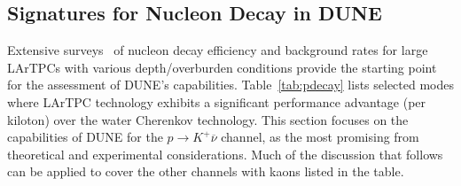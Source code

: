 \subsection{Signatures for Nucleon Decay in DUNE}

Extensive surveys~\cite{Bueno:2007um,Klinger:2015kva} of nucleon decay efficiency 
and background rates for large LArTPCs with various depth/overburden 
conditions provide the starting point for the 
assessment of DUNE's capabilities.  Table~\ref{tab:pdecay} lists selected
modes where LArTPC technology exhibits a significant performance 
advantage (per kiloton) over the water Cherenkov technology.
This section focuses on the capabilities 
of DUNE for the $p\to K^+\overline{\nu}$ channel, as the most 
promising from theoretical and experimental 
considerations.  Much of the discussion that follows can be 
applied to cover the other channels with kaons listed in 
the table.
%
\begin{table}[!htbp]
\caption[Efficiencies and background rates for nucleon decay modes]
        {Efficiencies and background rates (events per \SI{}{\Mtyr}) for nucleon decay 
         channels of interest for a large underground LArTPC~\cite{Bueno:2007um}, and 
         comparison with water Cherenkov detector capabilities.  
         The entries for the water Cherenkov capabilities are based 
         on experience with the \superk{} detector~\cite{kearns_isoups}.  
        }
\begin{center}
\end{center}
\label{tab:pdecay}
\end{table}

